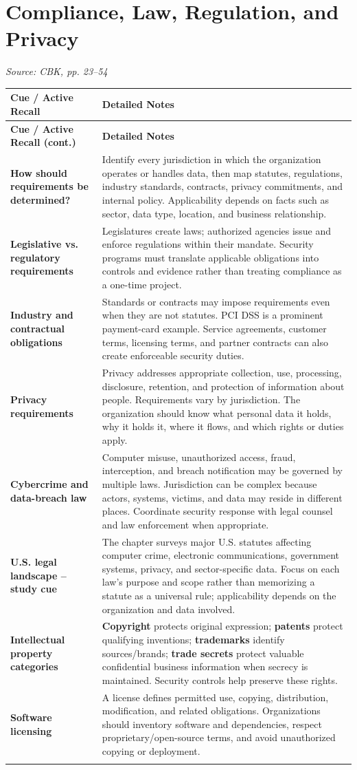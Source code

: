 \documentclass[10pt,letterpaper]{article}
\makeatletter
\newenvironment{cornell}
{\rowcolors{2}{white}{notebg}\begin{longtable}{@{}>{\raggedright\arraybackslash\columncolor{cuebg}\color{navy}\bfseries}p{0.285\textwidth}>{\raggedright\arraybackslash}p{0.65\textwidth}@{}}
\rowcolor{navy}\color{white}\textbf{Cue / Active Recall} & \color{white}\textbf{Detailed Notes}\\ \hline
\endfirsthead
\rowcolor{navy}\color{white}\textbf{Cue / Active Recall (cont.)} & \color{white}\textbf{Detailed Notes}\\ \hline
\endhead}
{\end{longtable}}
\newcommand{\noterow}[2]{#1 & #2\\\arrayrulecolor{line}\hline}
\newcommand{\source}[1]{\par{\footnotesize\color{teal}\textit{Source: CBK, #1}}\par}
\makeatother
\begin{document}
\section{\color{navy}Compliance, Law, Regulation, and Privacy}
\source{pp. 23--54}
\begin{cornell}
\noterow{How should requirements be determined?}{Identify every jurisdiction in which the organization operates or handles data, then map statutes, regulations, industry standards, contracts, privacy commitments, and internal policy. Applicability depends on facts such as sector, data type, location, and business relationship.}
\noterow{Legislative vs. regulatory requirements}{Legislatures create laws; authorized agencies issue and enforce regulations within their mandate. Security programs must translate applicable obligations into controls and evidence rather than treating compliance as a one-time project.}
\noterow{Industry and contractual obligations}{Standards or contracts may impose requirements even when they are not statutes. PCI DSS is a prominent payment-card example. Service agreements, customer terms, licensing terms, and partner contracts can also create enforceable security duties.}
\noterow{Privacy requirements}{Privacy addresses appropriate collection, use, processing, disclosure, retention, and protection of information about people. Requirements vary by jurisdiction. The organization should know what personal data it holds, why it holds it, where it flows, and which rights or duties apply.}
\noterow{Cybercrime and data-breach law}{Computer misuse, unauthorized access, fraud, interception, and breach notification may be governed by multiple laws. Jurisdiction can be complex because actors, systems, victims, and data may reside in different places. Coordinate security response with legal counsel and law enforcement when appropriate.}
\noterow{U.S. legal landscape -- study cue}{The chapter surveys major U.S. statutes affecting computer crime, electronic communications, government systems, privacy, and sector-specific data. Focus on each law's purpose and scope rather than memorizing a statute as a universal rule; applicability depends on the organization and data involved.}
\noterow{Intellectual property categories}{\textbf{Copyright} protects original expression; \textbf{patents} protect qualifying inventions; \textbf{trademarks} identify sources/brands; \textbf{trade secrets} protect valuable confidential business information when secrecy is maintained. Security controls help preserve these rights.}
\noterow{Software licensing}{A license defines permitted use, copying, distribution, modification, and related obligations. Organizations should inventory software and dependencies, respect proprietary/open-source terms, and avoid unauthorized copying or deployment.}

\end{cornell}
\end{document}
